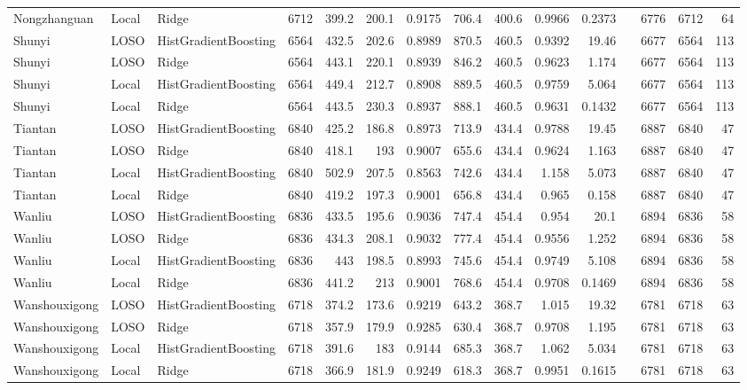 \begin{tabular}{lllrrrrrrrrlrrr}
Nongzhanguan & Local & Ridge & 6712 & 399.2 & 200.1 & 0.9175 & 706.4 & 400.6 & 0.9966 & 0.2373 &  & 6776 & 6712 & 64 \\
Shunyi & LOSO & HistGradientBoosting & 6564 & 432.5 & 202.6 & 0.8989 & 870.5 & 460.5 & 0.9392 & 19.46 &  & 6677 & 6564 & 113 \\
Shunyi & LOSO & Ridge & 6564 & 443.1 & 220.1 & 0.8939 & 846.2 & 460.5 & 0.9623 & 1.174 &  & 6677 & 6564 & 113 \\
Shunyi & Local & HistGradientBoosting & 6564 & 449.4 & 212.7 & 0.8908 & 889.5 & 460.5 & 0.9759 & 5.064 &  & 6677 & 6564 & 113 \\
Shunyi & Local & Ridge & 6564 & 443.5 & 230.3 & 0.8937 & 888.1 & 460.5 & 0.9631 & 0.1432 &  & 6677 & 6564 & 113 \\
Tiantan & LOSO & HistGradientBoosting & 6840 & 425.2 & 186.8 & 0.8973 & 713.9 & 434.4 & 0.9788 & 19.45 &  & 6887 & 6840 & 47 \\
Tiantan & LOSO & Ridge & 6840 & 418.1 & 193 & 0.9007 & 655.6 & 434.4 & 0.9624 & 1.163 &  & 6887 & 6840 & 47 \\
Tiantan & Local & HistGradientBoosting & 6840 & 502.9 & 207.5 & 0.8563 & 742.6 & 434.4 & 1.158 & 5.073 &  & 6887 & 6840 & 47 \\
Tiantan & Local & Ridge & 6840 & 419.2 & 197.3 & 0.9001 & 656.8 & 434.4 & 0.965 & 0.158 &  & 6887 & 6840 & 47 \\
Wanliu & LOSO & HistGradientBoosting & 6836 & 433.5 & 195.6 & 0.9036 & 747.4 & 454.4 & 0.954 & 20.1 &  & 6894 & 6836 & 58 \\
Wanliu & LOSO & Ridge & 6836 & 434.3 & 208.1 & 0.9032 & 777.4 & 454.4 & 0.9556 & 1.252 &  & 6894 & 6836 & 58 \\
Wanliu & Local & HistGradientBoosting & 6836 & 443 & 198.5 & 0.8993 & 745.6 & 454.4 & 0.9749 & 5.108 &  & 6894 & 6836 & 58 \\
Wanliu & Local & Ridge & 6836 & 441.2 & 213 & 0.9001 & 768.6 & 454.4 & 0.9708 & 0.1469 &  & 6894 & 6836 & 58 \\
Wanshouxigong & LOSO & HistGradientBoosting & 6718 & 374.2 & 173.6 & 0.9219 & 643.2 & 368.7 & 1.015 & 19.32 &  & 6781 & 6718 & 63 \\
Wanshouxigong & LOSO & Ridge & 6718 & 357.9 & 179.9 & 0.9285 & 630.4 & 368.7 & 0.9708 & 1.195 &  & 6781 & 6718 & 63 \\
Wanshouxigong & Local & HistGradientBoosting & 6718 & 391.6 & 183 & 0.9144 & 685.3 & 368.7 & 1.062 & 5.034 &  & 6781 & 6718 & 63 \\
Wanshouxigong & Local & Ridge & 6718 & 366.9 & 181.9 & 0.9249 & 618.3 & 368.7 & 0.9951 & 0.1615 &  & 6781 & 6718 & 63 \\
\bottomrule
\end{tabular}
